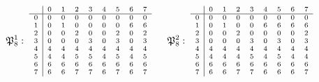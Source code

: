 \documentclass[11pt]{amsart}
\theoremstyle{definition}
\begin{document}
\begin{gather*}
\scriptsize
\mathfrak P_8^{1}:\ \begin{array}{c|cccccccc} & 0 & 1 & 2 & 3 & 4 & 5 & 6 & 7\\ \hline 0 & 0 & 0 & 0 & 0 & 0 & 0 & 0 & 0\\ 1 & 0 & 1 & 0 & 0 & 0 & 0 & 6 & 6\\ 2 & 0 & 0 & 2 & 0 & 0 & 2 & 0 & 2\\ 3 & 0 & 0 & 0 & 3 & 0 & 3 & 0 & 3\\ 4 & 4 & 4 & 4 & 4 & 4 & 4 & 4 & 4\\ 5 & 4 & 4 & 5 & 5 & 4 & 5 & 4 & 5\\ 6 & 6 & 6 & 6 & 6 & 6 & 6 & 6 & 6\\ 7 & 6 & 6 & 7 & 7 & 6 & 7 & 6 & 7\\\end{array}\qquad \mathfrak P_8^{2}:\ \begin{array}{c|cccccccc} & 0 & 1 & 2 & 3 & 4 & 5 & 6 & 7\\ \hline 0 & 0 & 0 & 0 & 0 & 0 & 0 & 0 & 0\\ 1 & 0 & 1 & 0 & 0 & 6 & 6 & 6 & 6\\ 2 & 0 & 0 & 2 & 0 & 0 & 0 & 0 & 2\\ 3 & 0 & 0 & 0 & 3 & 0 & 3 & 0 & 3\\ 4 & 4 & 4 & 4 & 4 & 4 & 4 & 4 & 4\\ 5 & 4 & 4 & 4 & 5 & 4 & 5 & 4 & 4\\ 6 & 6 & 6 & 6 & 6 & 6 & 6 & 6 & 6\\ 7 & 6 & 6 & 7 & 7 & 6 & 6 & 6 & 7\\\end{array}\\[1ex]

\end{gather*}
\end{document}
